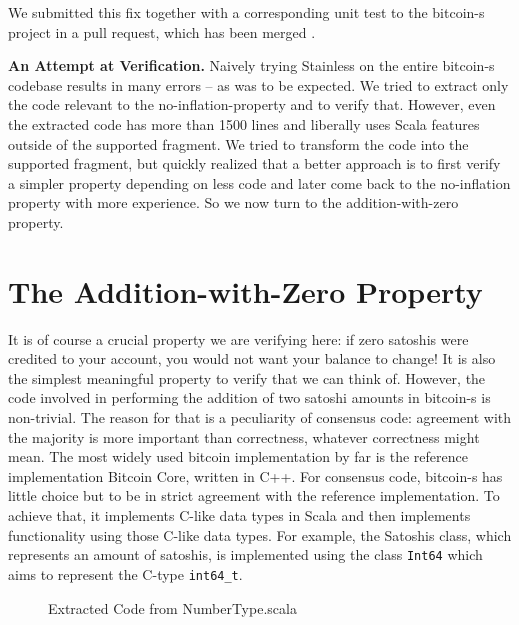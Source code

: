 \documentclass[runningheads]{llncs}
\renewcommand{\paragraph}{\textbf}%
\begin{document}
We submitted this fix together with a corresponding unit test to the
bitcoin-s project in a pull request, which has been merged
\cite{BitcoinS:pull435}.


\paragraph{An Attempt at Verification.} Naively trying Stainless on
the entire bitcoin-s codebase results in many errors -- as was to be
expected. We tried to extract only the code relevant to the
no-inflation-property and to verify that. However, even the extracted
code has more than 1500 lines and liberally uses Scala features
outside of the supported fragment. We tried to transform the code into
the supported fragment, but quickly realized that a better approach is
to first verify a simpler property depending on less code and later
come back to the no-inflation property with more experience. So we now
turn to the addition-with-zero property.




\section{The Addition-with-Zero Property}

It is of course a crucial property we are verifying here: if zero
satoshis were credited to your account, you would not want your
balance to change! It is also the simplest meaningful property to
verify that we can think of. However, the code involved in performing
the addition of two satoshi amounts in bitcoin-s is non-trivial. The
reason for that is a peculiarity of consensus code: agreement with the
majority is more important than correctness, whatever correctness
might mean. The most widely used bitcoin implementation by far is the
reference implementation Bitcoin Core, written in C++. For consensus
code, bitcoin-s has little choice but to be in strict agreement with
the reference implementation. To achieve that, it implements C-like
data types in Scala and then implements functionality using those
C-like data types. For example, the Satoshis class, which represents
an amount of satoshis, is implemented using the class \texttt{Int64} which
aims to represent the C-type \texttt{int64\_t}. 

\begin{figure}

  \caption{Extracted Code from NumberType.scala}
  \label{fig:numbertype}
\end{figure}
\end{document}
